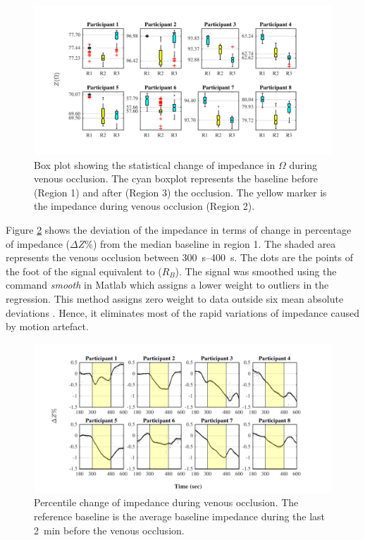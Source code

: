 \begin{figure}[htbp]
	\centering
	\includegraphics[width=15cm,keepaspectratio]{figure_vop_1}    
	\caption[Change of impedance during venous occlusion]{Box plot showing the statistical change of impedance in $\Omega$ during venous occlusion. The cyan boxplot represents the baseline before (Region 1) and after (Region 3) the occlusion. The yellow marker is the impedance during venous occlusion (Region 2).}
	\label{fig:venous statistics impedance}
\end{figure}  

Figure \ref{fig:venous occlusion impedance} shows the deviation of the impedance in terms of change in percentage of impedance ($\Delta Z\%$) from the median baseline in region 1. The shaded area represents the venous occlusion between \SIrange{300}{400}{\second}. The dots are the points of the foot of the signal equivalent to ($R_B$). The signal was smoothed using the command \textit{smooth} in Matlab which assigns a lower weight to outliers in the regression. This method assigns zero weight to data outside six mean absolute deviations \cite{MATLAB:2016}. Hence, it eliminates most of the rapid variations of impedance caused by motion artefact. 

\begin{figure}[htbp]
	\centering
	\includegraphics[width=15cm,keepaspectratio]{figure_vop_2}    
	\caption[Percentile variation of impedance during venous occlusion]{Percentile change of impedance during venous occlusion. The reference baseline is the average baseline impedance during the last \SI{2}{\minute} before the venous occlusion.}
	\label{fig:venous occlusion impedance}
\end{figure} 

